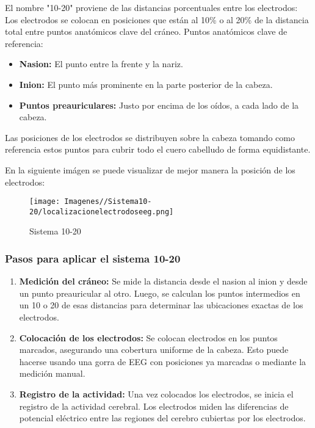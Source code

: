 \documentclass{article}
\begin{document}
El nombre "10-20" proviene de las distancias porcentuales entre los electrodos: Los electrodos se colocan en posiciones que están al 10\% o al 20\% de la distancia total entre puntos anatómicos clave del cráneo.
Puntos anatómicos clave de referencia:

\begin{itemize}

    \item \textbf{Nasion:} El punto entre la frente y la nariz.
    
    \item \textbf{Inion:} El punto más prominente en la parte posterior de la cabeza.
    
    \item \textbf{Puntos preauriculares:} Justo por encima de los oídos, a cada lado de la cabeza.
    
\end{itemize}

Las posiciones de los electrodos se distribuyen sobre la cabeza tomando como referencia estos puntos para cubrir todo el cuero cabelludo de forma equidistante.

\newpage

En la siguiente imágen se puede visualizar de mejor manera la posición de los electrodos:

\begin{figure}[H]

    \centering
    
    \texttt{[image: Imagenes//Sistema10-20/localizacionelectrodoseeg.png]}
    \caption{Sistema 10-20}
    
\end{figure}

\subsubsection{Pasos para aplicar el sistema 10-20}

\begin{enumerate}

    \item \textbf{Medición del cráneo:} Se mide la distancia desde el nasion al inion y desde un punto preauricular al otro. Luego, se calculan los puntos intermedios en un 10 o 20 de esas distancias para determinar las ubicaciones exactas de los electrodos.
    
    \item \textbf{Colocación de los electrodos:} Se colocan electrodos en los puntos marcados, asegurando una cobertura uniforme de la cabeza. Esto puede hacerse usando una gorra de EEG con posiciones ya marcadas o mediante la medición manual.
    
    \item \textbf{Registro de la actividad:} Una vez colocados los electrodos, se inicia el registro de la actividad cerebral. Los electrodos miden las diferencias de potencial eléctrico entre las regiones del cerebro cubiertas por los electrodos.
    
\end{enumerate}
\end{document}
